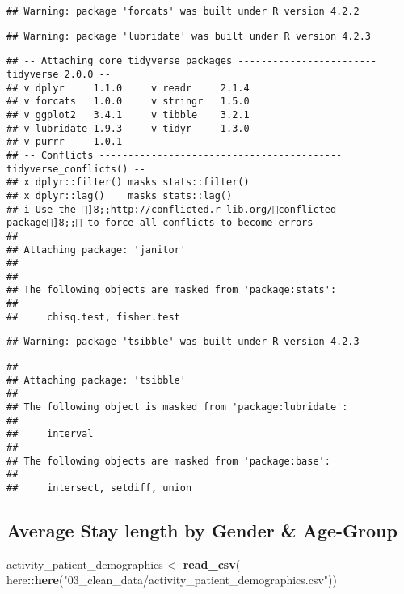 \documentclass[
]{article}
\newenvironment{Shaded}{\begin{snugshade}}{\end{snugshade}}
\newcommand{\FunctionTok}[1]{\textcolor[rgb]{0.13,0.29,0.53}{\textbf{#1}}}
\newcommand{\NormalTok}[1]{#1}
\newcommand{\OtherTok}[1]{\textcolor[rgb]{0.56,0.35,0.01}{#1}}
\newcommand{\SpecialCharTok}[1]{\textcolor[rgb]{0.81,0.36,0.00}{\textbf{#1}}}
\newcommand{\StringTok}[1]{\textcolor[rgb]{0.31,0.60,0.02}{#1}}
\begin{document}
\begin{verbatim}
## Warning: package 'forcats' was built under R version 4.2.2
\end{verbatim}

\begin{verbatim}
## Warning: package 'lubridate' was built under R version 4.2.3
\end{verbatim}

\begin{verbatim}
## -- Attaching core tidyverse packages ------------------------ tidyverse 2.0.0 --
## v dplyr     1.1.0     v readr     2.1.4
## v forcats   1.0.0     v stringr   1.5.0
## v ggplot2   3.4.1     v tibble    3.2.1
## v lubridate 1.9.3     v tidyr     1.3.0
## v purrr     1.0.1     
## -- Conflicts ------------------------------------------ tidyverse_conflicts() --
## x dplyr::filter() masks stats::filter()
## x dplyr::lag()    masks stats::lag()
## i Use the ]8;;http://conflicted.r-lib.org/conflicted package]8;; to force all conflicts to become errors
## 
## Attaching package: 'janitor'
## 
## 
## The following objects are masked from 'package:stats':
## 
##     chisq.test, fisher.test
\end{verbatim}

\begin{verbatim}
## Warning: package 'tsibble' was built under R version 4.2.3
\end{verbatim}

\begin{verbatim}
## 
## Attaching package: 'tsibble'
## 
## The following object is masked from 'package:lubridate':
## 
##     interval
## 
## The following objects are masked from 'package:base':
## 
##     intersect, setdiff, union
\end{verbatim}

\hypertarget{average-stay-length-by-gender-age-group}{%
\subsection{Average Stay length by Gender \&
Age-Group}\label{average-stay-length-by-gender-age-group}}

\begin{Shaded}
\begin{Highlighting}[]
\NormalTok{activity\_patient\_demographics }\OtherTok{\textless{}{-}} \FunctionTok{read\_csv}\NormalTok{(}
\NormalTok{  here}\SpecialCharTok{::}\FunctionTok{here}\NormalTok{(}\StringTok{"03\_clean\_data/activity\_patient\_demographics.csv"}\NormalTok{))}
\end{Highlighting}
\end{Shaded}
\end{document}
